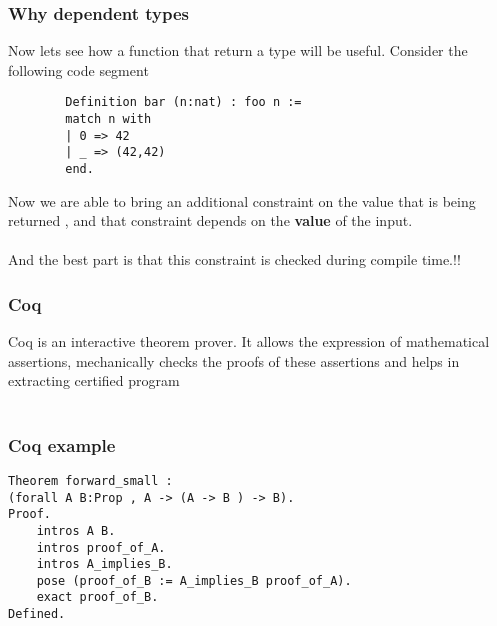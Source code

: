 \documentclass{beamer}
\begin{document}
\begin{frame}[fragile]
    \frametitle{Why dependent types}
    Now lets see how a function that return a type will be useful. Consider the following code segment
    \begin{verbatim}
        Definition bar (n:nat) : foo n :=
        match n with
        | 0 => 42
        | _ => (42,42)
        end.
    \end{verbatim}
    Now we are able to bring an additional constraint on the value  that is being returned , and that 
    constraint depends on the \textbf{value} of the input. \\~\\
    And the best part is that this constraint is checked during compile time.!!
    
\end{frame}

\begin{frame}
    \frametitle{Coq}
        Coq is an interactive theorem prover. It allows the expression of mathematical assertions,
        mechanically checks the proofs of these assertions and helps in extracting certified program 
        \\~\\
        \begin{itemize}
        \end{itemize}
    

\end{frame}

\begin{frame}[fragile]
    \frametitle{Coq example}
    \begin{verbatim}
Theorem forward_small : 
(forall A B:Prop , A -> (A -> B ) -> B).
Proof.
    intros A B.
    intros proof_of_A.
    intros A_implies_B.
    pose (proof_of_B := A_implies_B proof_of_A).
    exact proof_of_B.
Defined. 
    \end{verbatim}

    \begin{itemize}
    \end{itemize}
    

\end{frame}
\end{document}
